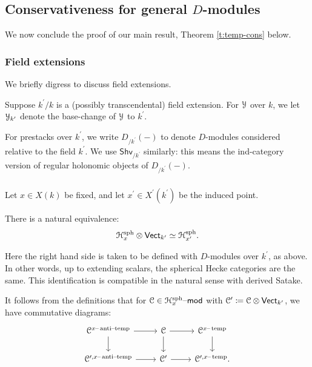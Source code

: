 \documentclass[reqno,11pt]{amsart}
\numberwithin{equation}{subsection}
\theoremstyle{remark}
\newcommand{\sC}{{\EuScript C}}
\newcommand{\sH}{{\EuScript H}}
\newcommand{\sY}{{\EuScript Y}}
\newcommand{\on}{\operatorname}
\newcommand{\mathendash}{\text{\textendash}}
\newcommand{\Vect}{\mathsf{Vect}}
\renewcommand{\mod}{\mathendash\mathsf{mod}}
\newcommand{\Shv}{\mathsf{Shv}}
\newcommand{\xat}{x\mathendash\on{anti}\!\mathendash\!\on{temp}}
\newcommand{\xtemp}{x\mathendash\on{temp}}
\begin{document}
\subsection{Conservativeness for general $D$-modules} 

We now conclude the proof of our main result, Theorem \ref{t:temp-cons} below.

\subsubsection{Field extensions}\label{sss:temperedness-field-extns}

We briefly digress to discuss field extensions.

Suppose $k^{\prime}/k$ is a (possibly transcendental) field extension.
For $\sY$ over $k$, we let $\sY_{k^{\prime}}$ denote the base-change
of $\sY$ to $k^{\prime}$.

For prestacks over $k^{\prime}$, we write $D_{/k^{\prime}}(-)$ to 
denote $D$-modules considered relative to the field $k^{\prime}$.
We use $\Shv_{/k^{\prime}}$ similarly: this means the ind-category
version of regular holonomic objects of $D_{/k^{\prime}}(-)$.

\subsubsection{}\label{sss:field-temp}

Let $x \in X(k)$ be fixed, and let
$x^{\prime} \in X^{\prime}(k^{\prime})$ be the induced point.

There is a natural equivalence:
%
\[
\sH_x^{\on{sph}} \otimes \Vect_{k^{\prime}} \simeq 
\sH_{x^{\prime}}^{\on{sph}}.
\]

\noindent Here the right hand side is taken to be defined with $D$-modules
over $k^{\prime}$, as above.
In other words, up to extending scalars, the spherical
Hecke categories are the same. This identification is compatible
in the natural sense with derived Satake.

It follows from the definitions that for $\sC \in \sH_x^{\on{sph}}\mod$ with 
$\sC^{\prime} \coloneqq \sC \otimes \Vect_{k^{\prime}}$, we have
commutative diagrams:
%
\[
\begin{tikzcd}
\sC^{\xat} 
\arrow[r]
\arrow[d]
&
\sC
\arrow[r]
\arrow[d]
&
\sC^{\xtemp}
\arrow[d]
\\
\sC^{\prime,\xat} 
\arrow[r]
&
\sC^{\prime}
\arrow[r]
&
\sC^{\prime,\xtemp}.
\end{tikzcd}
\]
\end{document}
